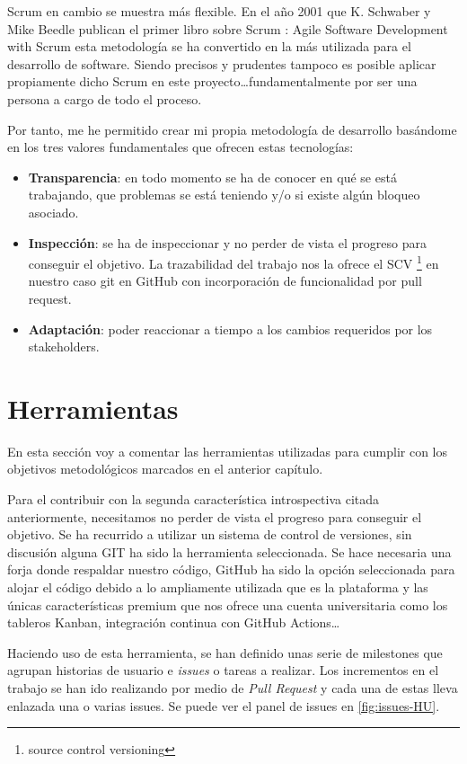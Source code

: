 Scrum en cambio se muestra más flexible. En el año 2001 que K. Schwaber y Mike Beedle
publican el primer libro sobre Scrum \cite{agile_book}: Agile Software Development with
Scrum esta metodología se ha convertido en la más utilizada para el desarrollo de
software. Siendo precisos y prudentes tampoco es posible aplicar propiamente dicho Scrum
en este proyecto\ldots fundamentalmente por ser una persona a cargo de todo el proceso.

Por tanto, me he permitido crear mi propia metodología de desarrollo basándome en los tres
valores fundamentales que ofrecen estas tecnologías:
\begin{itemize}
    \item \textbf{Transparencia}: en todo momento se ha de conocer en qué se está
    trabajando, que problemas se está teniendo y/o si existe algún bloqueo asociado.
    \item \textbf{Inspección}: se ha de inspeccionar y no perder de vista el progreso para
    conseguir el objetivo. La trazabilidad del trabajo nos la ofrece el SCV \footnote{source
    control versioning} en nuestro caso git en GitHub con incorporación de funcionalidad por pull
    request.
    \item \textbf{Adaptación}: poder reaccionar a tiempo a los cambios requeridos por los
    stakeholders.
\end{itemize}


\section{Herramientas}
En esta sección voy a comentar las herramientas utilizadas para cumplir con los objetivos
metodológicos marcados en el anterior capítulo.

Para el contribuir con la segunda característica introspectiva citada anteriormente,
necesitamos no perder de vista el progreso para conseguir el objetivo. Se ha recurrido a
utilizar un sistema de control de versiones, sin discusión alguna GIT ha sido la
herramienta seleccionada. Se hace necesaria una forja donde respaldar nuestro código,
GitHub ha sido la opción seleccionada para alojar el código debido a lo ampliamente
utilizada que es la plataforma y las únicas características premium que nos ofrece una cuenta universitaria como los
tableros Kanban, integración continua con GitHub Actions\ldots

Haciendo uso de esta herramienta, se han definido unas serie de milestones que agrupan
historias de usuario e \textit{issues} o tareas a realizar. Los incrementos en el trabajo se han
ido realizando por medio de \textit{Pull Request} y cada una de estas lleva enlazada una o varias
issues. Se puede ver el panel de issues en \ref{fig:issues-HU}.

